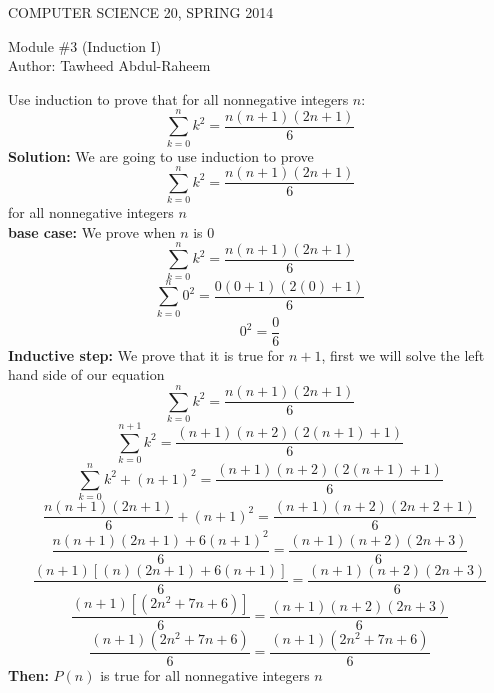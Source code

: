 \documentclass[12pt]{article}
\begin{document}
\begin{center}
COMPUTER SCIENCE 20, SPRING 2014 \\
\smallskip

Module \#3 (Induction I)\\
Author: Tawheed Abdul-Raheem\\
\end{center}
\medskip



Use induction to prove that for all nonnegative integers $n$:
\[ \sum_{k=0}^{n}k^{2}=\frac{n(n+1)(2n+1)}{6} \]
\textbf{Solution: } We are going to use induction to prove
\[ \sum_{k=0}^{n}k^{2}=\frac{n(n+1)(2n+1)}{6} \]
for all nonnegative integers $n$ \\
\textbf{base case: } We prove when $n$ is $0$
\[ \sum_{k=0}^{n}k^{2}=\frac{n(n+1)(2n+1)}{6} \]
\[ \sum_{k=0}^{n}0^{2}=\frac{0(0+1)(2(0)+1)}{6} \]
\[0^2 = \frac{0}{6} \]
\textbf{Inductive step: } We prove that it is true for $n+1$, first we will solve
the left hand side of our equation
\[ \sum_{k=0}^{n}k^{2}=\frac{n(n+1)(2n+1)}{6} \]
\[ \sum_{k=0}^{n+1}k^{2}=\frac{(n+1)(n+2)(2(n+1)+1)}{6} \]
\[ \sum_{k=0}^{n}k^{2} + (n+1)^{2}=\frac{(n+1)(n+2)(2(n+1)+1)}{6} \]
\[ \frac{n(n+1)(2n+1)}{6}+(n+1)^{2}=\frac{(n+1)(n+2)(2n+2+1)}{6} \]
\[ \frac{n(n+1)(2n+1)+6(n+1)^{2}}{6}=\frac{(n+1)(n+2)(2n+3)}{6} \]
\[ \frac{(n+1)[(n)(2n+1)+6(n+1)]}{6}=\frac{(n+1)(n+2)(2n+3)}{6} \]
\[ \frac{(n+1)[(2n^{2}+7n+6)]}{6}=\frac{(n+1)(n+2)(2n+3)}{6} \]
\[ \frac{(n+1)(2n^{2}+7n+6)}{6}=\frac{(n+1)(2n^{2}+7n + 6)}{6} \]
\textbf{Then: } $P(n)$ is true for all nonnegative integers $n$
\end{document}
